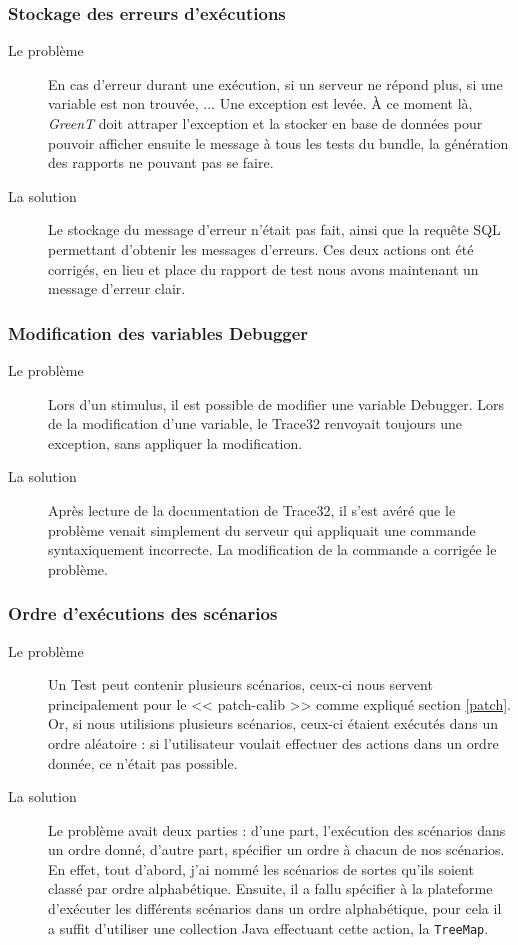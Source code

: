 	\subsubsection{Stockage des erreurs d'exécutions}
	\begin{description}
		\item[Le problème] En cas d'erreur durant une exécution, si un serveur ne répond plus, si une variable est non trouvée, ... Une exception est levée. À ce moment là, \textit{GreenT} doit attraper l'exception et la stocker en base de données pour pouvoir afficher ensuite le message à tous les tests du bundle, la génération des rapports ne pouvant pas se faire.
		\item[La solution] Le stockage du message d'erreur n'était pas fait, ainsi que la requête SQL permettant d'obtenir les messages d'erreurs. Ces deux actions ont été corrigés, en lieu et place du rapport de test nous avons maintenant un message d'erreur clair.
		\end{description}
		
	\subsubsection{Modification des variables Debugger}
		\begin{description}
			\item[Le problème] Lors d'un stimulus, il est possible de modifier une variable Debugger. Lors de la modification d'une variable, le Trace32 renvoyait toujours une exception, sans appliquer la modification.
			\item[La solution] Après lecture de la documentation de Trace32, il s'est avéré que le problème venait simplement du serveur qui appliquait une commande syntaxiquement incorrecte. La modification de la commande a corrigée le problème.
	\end{description}
	
	\subsubsection{Ordre d'exécutions des scénarios}
		\begin{description}
			\item[Le problème] Un Test peut contenir plusieurs scénarios, ceux-ci nous servent principalement pour le << patch-calib >> comme expliqué section \ref{patch}. Or, si nous utilisions plusieurs scénarios, ceux-ci étaient exécutés dans un ordre aléatoire : si l'utilisateur voulait effectuer des actions dans un ordre donnée, ce n'était pas possible.
			\item[La solution] Le problème avait deux parties : d'une part, l'exécution des scénarios dans un ordre donné, d'autre part, spécifier un ordre à chacun de nos scénarios. En effet, tout d'abord, j'ai nommé les scénarios de sortes qu'ils soient classé par ordre alphabétique. Ensuite, il a fallu spécifier à la plateforme d'exécuter les différents scénarios dans un ordre alphabétique, pour cela il a suffit d'utiliser une collection Java effectuant cette action, la \texttt{TreeMap}.
	\end{description}
	
